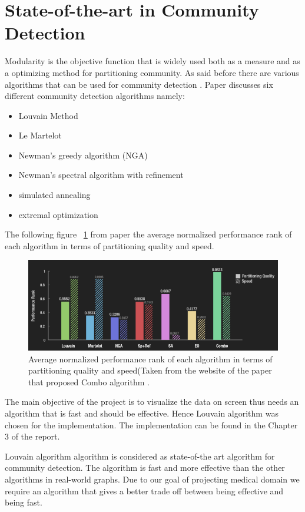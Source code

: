 \section{State-of-the-art in Community Detection}
Modularity is the objective function that is widely used both as a measure and as a optimizing method for partitioning community.
As said before there are various algorithms that can be used for community detection . Paper \cite{generalcommunity} discusses six different community detection algorithms namely: 
\begin{itemize}
\item Louvain Method
\item Le Martelot
\item Newman’s greedy algorithm (NGA)
\item Newman’s spectral algorithm with refinement
\item simulated annealing
\item extremal optimization
\end{itemize}
The following figure ~\ref{Fig1} from paper \cite{generalcommunity} the average normalized performance rank of each algorithm in terms of partitioning quality and speed.  
\begin{figure}[H]
\centering
\includegraphics[scale=0.5]{lou.png}
\caption{\label{Fig1}Average normalized performance rank of each algorithm in terms of partitioning quality and speed(Taken from the website of the paper that proposed Combo algorithm \cite{generalcommunity}.}

\end{figure}
The main objective of the project is to visualize the data on screen thus needs an algorithm that is fast and should be effective.  Hence Louvain algorithm was chosen for the implementation. The implementation can be found in the Chapter 3 of the report.


Louvain algorithm algorithm is considered as state-of-the art algorithm for community detection\cite{Louvain}. The algorithm is fast and more effective than the other algorithms in real-world graphs. Due to our goal of projecting medical domain we require an algorithm that gives a better trade off between being effective and being fast. 

